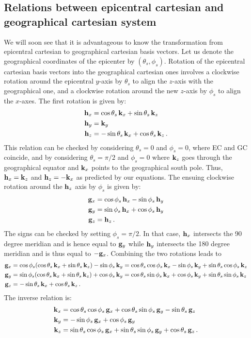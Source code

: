 \documentclass[12pt,a4paper]{article}
\renewcommand{\v}[1]{{\bf #1}}
\begin{document}
\subsection{Relations between epicentral cartesian and geographical cartesian system}
We will soon see that it is advantageous to know the transformation from epicentral cartesian to geographical cartesian basis vectors. Let us denote the geographical coordinates of the epicenter by $(\theta_s,\phi_s)$. Rotation of the epicentral cartesian basis vectors into the geographical cartesian ones involves a clockwise rotation around the epicentral $y$-axis by $\theta_s$ to align the $z$-axis with the geographical one, and a clockwise rotation around the new $z$-axis by $\phi_s$ to align the $x$-axes. The first rotation is given by:
\begin{align}
\v{h}_x &= \cos\theta_s\,\v{k}_x +\sin\theta_s\,\v{k}_z \notag \\
\v{h}_y &= \v{k}_y  \notag \\
\v{h}_z &= -\sin\theta_s\,\v{k}_x + \cos\theta_s\,\v{k}_z \,.
\end{align}      
This relation can be checked by considering $\theta_s=0$ and $\phi_s=0$, where EC and GC coincide, and by considering $\theta_s=\pi/2$ and $\phi_s=0$ where $\v{k}_z$ goes through the geographical equator and $\v{k}_x$ points to the geographical south pole. Thus, $\v{h}_x=\v{k}_z$ and $\v{h}_z=-\v{k}_x$ as predicted by our equations. The ensuing clockwise rotation around the $\v{h}_z$ axis by $\phi_s$ is given by:
\begin{align}
\v{g}_x &= \cos\phi_s\,\v{h}_x - \sin\phi_s\,\v{h}_y \notag \\
\v{g}_y &= \sin\phi_s\,\v{h}_x +\cos\phi_s\,\v{h}_y  \notag \\
\v{g}_z &= \v{h}_z \,.
\end{align}      
The signs can be checked by setting $\phi_s=\pi/2$. In that case, $\v{h}_x$ intersects the 90 degree meridian and is hence equal to $\v{g}_y$ while $\v{h}_y$ intersects the 180 degree meridian and is thus equal to $-\v{g}_x$. Combining the two rotations leads to
\begin{align}\label{eq:ectogc}
\v{g}_x &= \cos\phi_s (\cos\theta_s\,\v{k}_x +\sin\theta_s\,\v{k}_z) - \sin\phi_s\,\v{k}_y = \cos\theta_s\cos\phi_s\,\v{k}_x - \sin\phi_s\,\v{k}_y + \sin\theta_s\cos\phi_s\,\v{k}_z \notag \\
\v{g}_y &= \sin\phi_s (\cos\theta_s\,\v{k}_x +\sin\theta_s\,\v{k}_z) +\cos\phi_s\,\v{k}_y  = \cos\theta_s\sin\phi_s\,\v{k}_x + \cos\phi_s\,\v{k}_y + \sin\theta_s\sin\phi_s\,\v{k}_z\notag\\
\v{g}_z &= -\sin\theta_s\,\v{k}_x + \cos\theta_s\,\v{k}_z \,.
\end{align}      
The inverse relation is:
\begin{align}\label{eq:gctoec}
\v{k}_x &= \cos\theta_s\cos\phi_s\,\v{g}_x +\cos\theta_s\sin\phi_s\,\v{g}_y -\sin\theta_s\,\v{g}_z \notag \\
\v{k}_y &= - \sin\phi_s\,\v{g}_x + \cos\phi_s\,\v{g}_y \notag\\
\v{k}_z &= \sin\theta_s\cos\phi_s\,\v{g}_x + \sin\theta_s\sin\phi_s\,\v{g}_y + \cos\theta_s\,\v{g}_z \,.
\end{align}      
\end{document}
